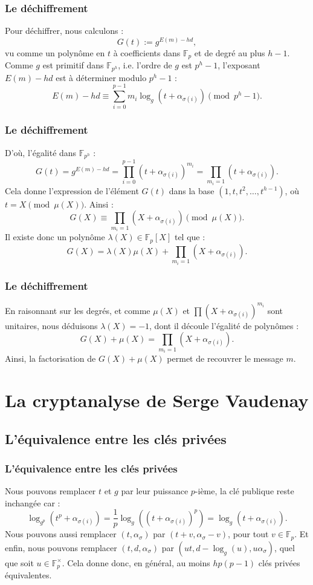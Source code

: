 \documentclass{beamer}
\theoremstyle{definition}
\theoremstyle{remark}
\def\gf #1{\mathbb{F}_{#1}}
\begin{document}
\begin{frame}
  \frametitle{Le déchiffrement}
  Pour déchiffrer, nous calculons :
$$G(t) := g^{E(m) - hd},$$
vu comme un polynôme en $t$ à coefficients dans $\gf{p}$ et de degré au plus $h-1$. Comme $g$ est primitif dans $\gf{p^h}$, i.e. l'ordre de $g$ est $p^h-1$, l'exposant $E(m) - hd$ est à déterminer modulo $p^h-1$ :
$$E(m) - hd \equiv  \sum_{i=0}^{p-1} m_i\log_g\left(t + \alpha_{\sigma(i)}\right) \pmod{p^h-1}.$$
\end{frame}
\begin{frame}
  \frametitle{Le déchiffrement}
D'où, l'égalité dans $\gf{p^h}$ :
$$G(t) = g^{E(m) - hd} = \prod_{i=0}^{p-1} \left(t+\alpha_{\sigma(i)}\right)^{m_i} = \prod_{m_i = 1} \left(t+\alpha_{\sigma(i)}\right).$$
Cela donne l'expression de l'élément $G(t)$ dans la base $(1,t,t^2, \dots, t^{h-1})$, où $t = X \pmod{\mu(X)}$. Ainsi :
$$G(X) \equiv \prod_{m_i = 1} \left(X+\alpha_{\sigma(i)}\right) \pmod{\mu(X)}.$$
Il existe donc un polynôme $\lambda(X) \in \gf{p}[X]$ tel que : $$G(X) = \lambda(X) \mu(X) + \prod_{m_i = 1} \left(X+\alpha_{\sigma(i)}\right).$$
\end{frame}
\begin{frame}
  \frametitle{Le déchiffrement}
En raisonnant sur les degrés, et comme $\mu(X)$ et $\prod \left(X+\alpha_{\sigma(i)}\right)^{m_i}$ sont unitaires, nous déduisons  $\lambda(X) = -1$, dont il découle l'égalité de polynômes :
$$G(X) + \mu(X) = \prod_{m_i = 1} \left(X+\alpha_{\sigma(i)}\right).$$
Ainsi, la factorisation de $G(X)+\mu(X)$ permet de recouvrer le message $m$.
\end{frame}

\section{La cryptanalyse de Serge Vaudenay}
\subsection{L'équivalence entre les clés privées}
\begin{frame}
	\frametitle{L'équivalence entre les clés privées}
Nous pouvons remplacer $t$ et $g$ par leur puissance $p$-ième, la clé publique reste inchangée car :
$$\log_{g^p}\left(t^p + \alpha_{\sigma(i)}\right) = \frac{1}{p}\log_{g}\left(\left(t + \alpha_{\sigma(i)}\right)^p\right) = \log_{g}\left(t + \alpha_{\sigma(i)}\right).$$
Nous pouvons aussi remplacer $(t, \alpha_{\sigma})$ par $(t + v, \alpha_{\sigma} - v)$, pour tout $v \in \gf{p}$. Et enfin, nous pouvons remplacer $(t,d,\alpha_\sigma)$ par $(ut, d - \log_g(u), u\alpha_\sigma)$, quel que soit $u \in \gf{p}^\times$.
Cela donne donc, en général, au moins $hp(p-1)$ clés privées équivalentes.
\end{frame}
\end{document}
